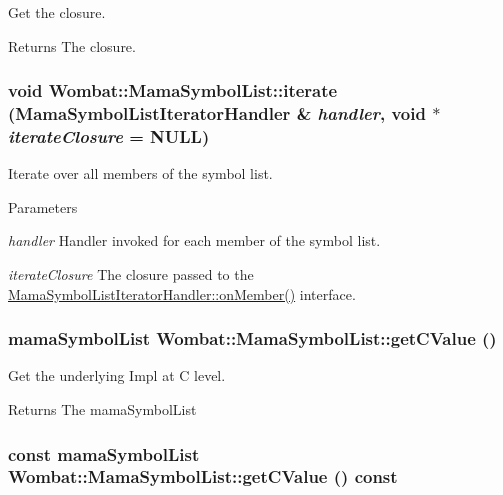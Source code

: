 Get the closure. \begin{DoxyReturn}{Returns}
The closure. 
\end{DoxyReturn}
\hypertarget{classWombat_1_1MamaSymbolList_abd26a14e154744f08713aab75c9aece3}{
\subsubsection[{iterate}]{\setlength{\rightskip}{0pt plus 5cm}void Wombat::MamaSymbolList::iterate ({\bf MamaSymbolListIteratorHandler} \& {\em handler}, \/  void $\ast$ {\em iterateClosure} = {\ttfamily NULL})}}
\label{classWombat_1_1MamaSymbolList_abd26a14e154744f08713aab75c9aece3}


Iterate over all members of the symbol list. 
\begin{DoxyParams}{Parameters}
\item[{\em handler}]Handler invoked for each member of the symbol list. \item[{\em iterateClosure}]The closure passed to the \hyperlink{classWombat_1_1MamaSymbolListIteratorHandler_a4473a13b92c04377588fe0178ad04dad}{MamaSymbolListIteratorHandler::onMember()} interface. \end{DoxyParams}
\hypertarget{classWombat_1_1MamaSymbolList_a1a1457638a518b7df33505a7f67de2dc}{
\subsubsection[{getCValue}]{\setlength{\rightskip}{0pt plus 5cm}mamaSymbolList Wombat::MamaSymbolList::getCValue ()}}
\label{classWombat_1_1MamaSymbolList_a1a1457638a518b7df33505a7f67de2dc}


Get the underlying Impl at C level. \begin{DoxyReturn}{Returns}
The mamaSymbolList 
\end{DoxyReturn}
\hypertarget{classWombat_1_1MamaSymbolList_a532c57ed3ff01980ab120bc1a18e1d44}{
\subsubsection[{getCValue}]{\setlength{\rightskip}{0pt plus 5cm}const mamaSymbolList Wombat::MamaSymbolList::getCValue () const}}
\label{classWombat_1_1MamaSymbolList_a532c57ed3ff01980ab120bc1a18e1d44}


